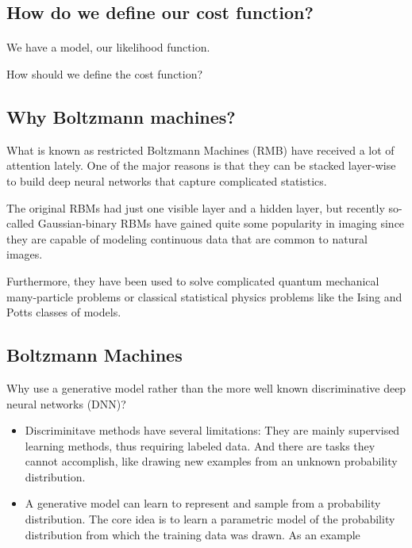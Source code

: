 \documentclass[aip,jcp,reprint,floatfix]{revtex4-1}
\begin{document}
\begin{itemize}
\subsection*{How do we define our cost function?}

\paragraph{}
We have a model, our likelihood function. 

How should we define the cost function?


\subsection*{Why Boltzmann machines?}

What is known as restricted Boltzmann Machines (RMB) have received a lot of attention lately. 
One of the major reasons is that they can be stacked layer-wise to build deep neural networks that capture complicated statistics.

The original RBMs had just one visible layer and a hidden layer, but recently so-called Gaussian-binary RBMs have gained quite some popularity in imaging since they are capable of modeling continuous data that are common to natural images. 

Furthermore, they have been used to solve complicated quantum mechanical many-particle problems or classical statistical physics problems like the Ising and Potts classes of models. 



\subsection*{Boltzmann Machines}

Why use a generative model rather than the more well known discriminative deep neural networks (DNN)? 

\begin{itemize}
\item Discriminitave methods have several limitations: They are mainly supervised learning methods, thus requiring labeled data. And there are tasks they cannot accomplish, like drawing new examples from an unknown probability distribution.

\item A generative model can learn to represent and sample from a probability distribution. The core idea is to learn a parametric model of the probability distribution from which the training data was drawn. As an example
\begin{enumerate}


\end{enumerate}
\end{itemize}
\end{itemize}
\end{document}
